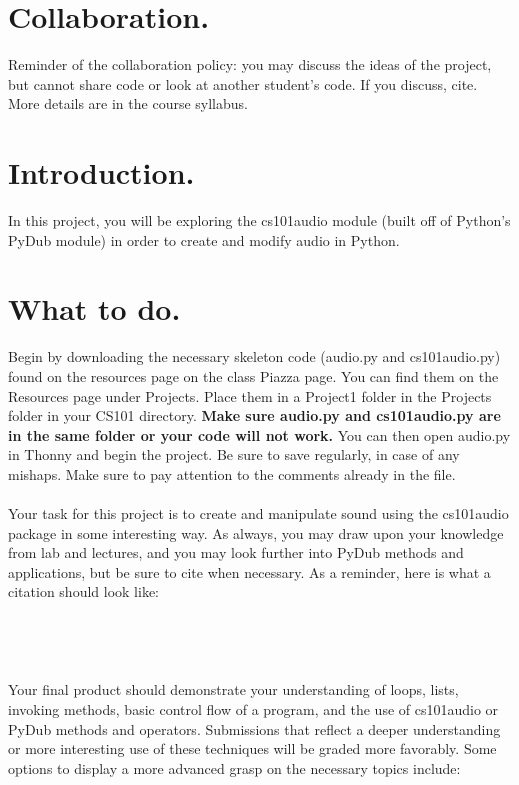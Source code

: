 \documentclass[11pt, letterpaper, onecolumn, oneside, final]{article}
\begin{document}
    \maketitle


    \section{Collaboration.} Reminder of the collaboration policy: you may discuss the ideas of the project, but cannot share code or look at another student’s code. If you discuss, cite. More details are in the course syllabus. 

    \section{Introduction.} In this project, you will be exploring the {\consolas cs101audio} module (built off of Python's {\consolas PyDub} module) in order to create and modify audio in Python. 
     
    \section{What to do.} Begin by downloading the necessary skeleton code ({\consolas audio.py} and {\consolas cs101audio.py}) found on the resources page on the class Piazza page. You can find them on the Resources page under Projects. Place them in a Project1 folder in the Projects folder in your CS101 directory. \textbf{Make sure {\consolas audio.py} and {\consolas cs101audio.py} are in the same folder or your code will not work.} You can then open {\consolas audio.py} in Thonny and begin the project. Be sure to save regularly, in case of any mishaps. Make sure to pay attention to the comments already in the file.\\
    \\
    Your task for this project is to create and manipulate sound using the {\consolas cs101audio} package in some interesting way. As always, you may draw upon your knowledge from lab and lectures, and you may look further into {\consolas PyDub} methods and applications, but be sure to cite when necessary. As a reminder, here is what a citation should look like:
    \\ 
    \\
    \\
    \\ 
    \\
    Your final product should demonstrate your understanding of loops, lists, invoking methods, basic control flow of a program, and the use of {\consolas cs101audio} or {\consolas PyDub} methods and operators. 
    Submissions that reflect a deeper understanding or more interesting use of these techniques will be graded more favorably. Some options to display a more advanced grasp on the necessary topics include:
    
\end{document}
